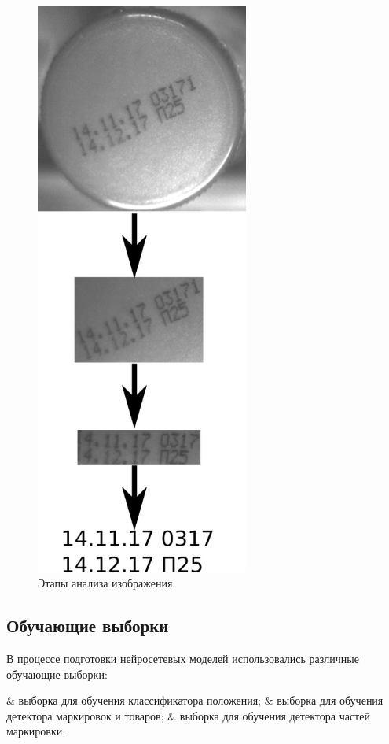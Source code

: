 \begin{figure}[!ht]
	\centering
	\includegraphics[width=7cm]{man-source/images/ch4/pic4-5.png}
	\caption{Этапы анализа изображения}
	\label{fig:system_work}
\end{figure}

\subsection{Обучающие выборки}

В процессе подготовки нейросетевых моделей использовались различные обучающие выборки:

\begin{easylist}
	& выборка для обучения классификатора положения;
	& выборка для обучения детектора маркировок и товаров;
	& выборка для обучения детектора частей маркировки.
\end{easylist} 

